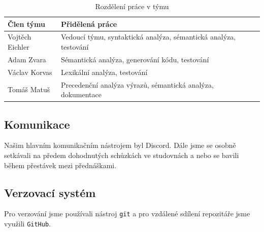 \documentclass[11pt]{article}
\begin{document}
\begin{table}[ht]
    \centering
    \begin{tabular}{|l|l|}
        \hline
        \textbf{Člen týmu} & \textbf{Přidělená práce} \\\hline
        Vojtěch Eichler & Vedoucí týmu, syntaktická analýza, sémantická analýza, testování \\
        Adam Zvara & Sémantická analýza, generování kódu, testování \\
        Václav Korvas & Lexikální analýza, testování \\
        Tomáš Matuš & Precedenční analýza výrazů, sémantická analýza, dokumentace \\\hline
    \end{tabular}
    \label{tabulka_rozdeleni_prace}
    \caption{Rozdělení práce v týmu}
\end{table}

\subsection{Komunikace}
Našim hlavním komunikačním nástrojem byl Discord.
Dále jsme se osobně setkávali na předem dohodnutých schůzkách ve studovnách a nebo se bavili během přestávek mezi přednáškami.

\subsection{Verzovací systém}
Pro verzování jsme používali nástroj \texttt{git} a pro vzdálené sdílení repozitáře jsme využili \texttt{GitHub}.
\end{document}
